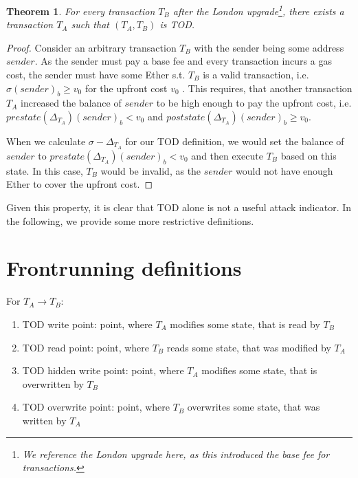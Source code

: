 \documentclass[draft,final]{vutinfth} %
\newtheorem{theorem}{Theorem}[section]
\begin{document}
\begin{theorem}
    For every transaction $T_B$ after the London upgrade\footnote{We reference the London upgrade here, as this introduced the base fee for transactions.}, there exists a transaction $T_A$ such that $(T_A, T_B)$ is TOD.
\end{theorem}

\begin{proof}
    Consider an arbitrary transaction $T_B$ with the sender being some address $sender$. As the sender must pay a base fee and every transaction incurs a gas cost, the sender must have some Ether s.t. $T_B$ is a valid transaction, i.e. $\sigma(sender)_b \ge v_0$ for the upfront cost $v_0$ \cite[p.8-9]{wood_ethereum_2024}. This requires, that another transaction $T_A$ increased the balance of $sender$ to be high enough to pay the upfront cost, i.e. $prestate(\Delta_{T_A})(sender)_b < v_0$ and $poststate(\Delta_{T_A})(sender)_b \ge v_0$.
    
    When we calculate $\sigma - \Delta_{T_A}$ for our TOD definition, we would set the balance of $sender$ to $prestate(\Delta_{T_A})(sender)_b < v_0$ and then execute $T_B$ based on this state. In this case, $T_B$ would be invalid, as the $sender$ would not have enough Ether to cover the upfront cost.
\end{proof}

Given this property, it is clear that TOD alone is not a useful attack indicator. In the following, we provide some more restrictive definitions.

\iffalse
    \chapter{Frontrunning definitions}



    For $T_A \rightarrow T_B$:


    \begin{enumerate}
        \item TOD write point: point, where $T_A$ modifies some state, that is read by $T_B$
        \item TOD read point: point, where $T_B$ reads some state, that was modified by $T_A$
        \item TOD hidden write point: point, where $T_A$ modifies some state, that is overwritten by $T_B$
        \item TOD overwrite point: point, where $T_B$ overwrites some state, that was written by $T_A$
    \end{enumerate}
\end{document}
